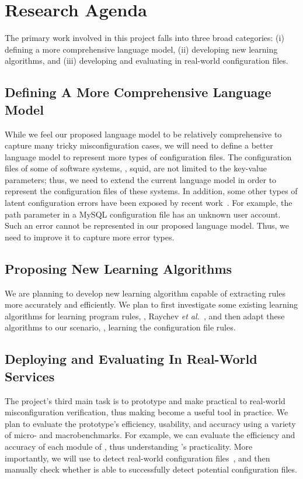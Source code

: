 
\section{Research Agenda}

The primary work involved in this project
falls into three broad categories:
(i) defining a more comprehensive language model,
(ii) developing new learning algorithms, and
(iii) developing and evaluating \app
  in real-world configuration files.

\subsection{Defining A More Comprehensive Language Model}

While we feel our proposed language model to be relatively comprehensive
to capture many tricky misconfiguration cases,
we will need to define a better language model to represent more types of
configuration files. The configuration files of some of software systems, 
\eg, squid, are not limited to the key-value parameters; thus,
we need to extend the current language model in order to represent
the configuration files of these systems.
In addition, some other types of latent configuration errors 
have been exposed by recent work~\cite{xu16early}.
For example, the path parameter in a MySQL configuration file
has an unknown user account. Such an error cannot be represented in
our proposed language model. Thus, we need to improve it to capture
more error types.

\subsection{Proposing New Learning Algorithms}

We are planning to develop new learning algorithm capable of extracting
rules more accurately and efficiently. We plan to first investigate 
some existing learning algorithms for learning program rules, \eg,
Raychev {\em et al.}~\cite{raychev15predicting, raychev16learning},
and then adapt these algorithms to our scenario, \ie, learning 
the configuration file rules.

\subsection{Deploying and Evaluating \app In Real-World Services}

The project's third main task is to prototype \app and make \app
practical to real-world misconfiguration verification,
thus making \app become a useful tool in practice.
We plan to evaluate the \app prototype's efficiency, usability, and
accuracy using a variety of micro- and macrobenchmarks.
For example, we can evaluate the efficiency and accuracy of 
each module of \app, thus understanding \app's practicality.
More importantly, we will use \app to detect real-world configuration
files~\cite{configdataset}, and then manually check whether \app is able
to successfully detect potential configuration files.
